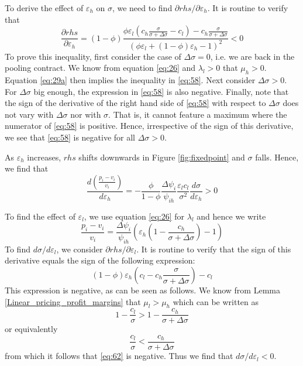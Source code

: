 \documentclass[a4paper,12pt]{article}
\begin{document}
To derive the effect of \(\varepsilon_h\) on \(\sigma\), we need to find \(\partial rhs/\partial \varepsilon_h\). It is routine to verify that
\begin{equation}
\label{eq:58}
\frac{\partial rhs}{\partial \varepsilon_h} =
(1-\phi) \frac{\phi \varepsilon_l (c_h \frac{\sigma}{\sigma+\Delta\sigma}-c_l)-c_h \frac{\sigma}{\sigma+\Delta\sigma}}{(\phi \varepsilon_l + (1-\phi)\varepsilon_h -1)^2} < 0
\end{equation}
To prove this inequality, first consider the case of \(\Delta \sigma=0\), i.e. we are back in the pooling contract. We know from equation \eqref{eq:26} and \(\lambda_l>0\) that \(\mu_h>0\). Equation \eqref{eq:29a} then implies the inequality in \eqref{eq:58}. Next consider \(\Delta \sigma > 0\). For \(\Delta \sigma\) big enough, the expression in \eqref{eq:58} is also negative. Finally, note that the sign of the derivative of the right hand side of \eqref{eq:58} with respect to \(\Delta \sigma\) does not vary with \(\Delta \sigma\) nor with \(\sigma\). That is, it cannot feature a maximum where the numerator of \eqref{eq:58} is positive. Hence, irrespective of the sign of this derivative, we see that \eqref{eq:58} is negative for all \(\Delta \sigma > 0\).

As \(\varepsilon_h\) increases, \(rhs\) shifts downwards in Figure \ref{fig:fixedpoint} and \(\sigma\) falls. Hence, we find that
\begin{equation}
\label{eq:45}
\frac{d\left(\frac{p_i-v_i}{v_i} \right)}{d \varepsilon_h} = - \frac{\phi}{1-\phi} \frac{\Delta \psi_i}{\psi_{ih}} \frac{\varepsilon_l c_l}{\sigma^2} \frac{d\sigma}{d\varepsilon_h} > 0
\end{equation}

To find the effect of \(\varepsilon_l\), we use equation \eqref{eq:26} for \(\lambda_l\) and hence we write
\begin{equation}
\label{eq:61}
\frac{p_i-v_i}{v_i} = \frac{\Delta\psi_i}{\psi_{ih}} \left(\varepsilon_h \left( 1-\frac{c_h}{\sigma+\Delta\sigma}\right)-1 \right)
\end{equation}
To find \(d\sigma/d\varepsilon_l\), we consider \(\partial rhs/\partial \varepsilon_l\). It is routine to verify that the sign of this derivative equals the sign of the following expression:
\begin{equation}
\label{eq:62}
(1-\phi) \varepsilon_h \left(c_l-c_h \frac{\sigma}{\sigma+\Delta\sigma} \right) - c_l
\end{equation}
This expression is negative, as can be seen as follows. We know from Lemma \ref{Linear_pricing_profit_margins} that \(\mu_l>\mu_h\) which can be written as
\begin{equation}
\label{eq:70}
1-\frac{c_l}{\sigma} > 1-\frac{c_h}{\sigma+\Delta\sigma}
\end{equation}
or equivalently
\begin{equation}
\label{eq:71}
\frac{c_l}{\sigma} < \frac{c_h}{\sigma+\Delta\sigma}
\end{equation}
from which it follows that \eqref{eq:62} is negative. Thus we find that \(d\sigma/d\varepsilon_l<0\).
\end{document}
